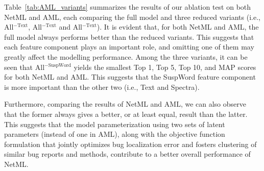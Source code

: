 
Table~\ref{tab:AML_variants} summarizes the results of our ablation test on both NetML and AML, each comparing the full model and three reduced variants (i.e., All$^{-\text{Text}}$, All$^{-\text{Text}}$ and All$^{-\text{Text}}$). It is evident that, for both NetML and AML,  the full model always performs better than the reduced variants. This suggests that each feature component plays an important role, and omitting one of them may greatly affect the modelling performance. Among the three variants, it can be seen that {All}$^{-\text{SuspWord}}$ yields the smallest Top 1, Top 5, Top 10, and MAP scores for both NetML and AML. This suggests that the SuspWord feature component is more important than the other two (i.e., Text and Spectra).

Furthermore, comparing the results of NetML and AML, we can also observe that the former always gives a better, or at least equal, result than the latter. This suggests that the model parameterization using two sets of latent parameters (instead of one in AML), along with the objective function formulation that jointly optimizes bug localization error and fosters clustering of similar bug reports and methods, contribute to a better overall performance of NetML.


